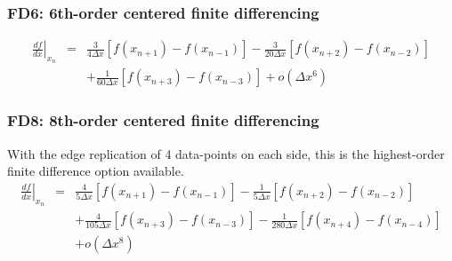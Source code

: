 \documentclass[11pt]{article}
\def\bea{\begin{eqnarray}}
\def\eea{\end{eqnarray}}
\begin{document}
\subsubsection*{FD6: 6th-order centered finite differencing}

\bea \left.\frac{df}{dx}\right|_{x_n} &=&
\frac{3}{4\Delta
x}[f(x_{n+1})-f(x_{n-1})]-\frac{3}{20\Delta x}[f(x_{n+2})-f(x_{n-2})]\nonumber\\
&&+\frac{1}{60\Delta x}[f(x_{n+3})-f(x_{n-3})]+o(\Delta x^6) \eea

\subsubsection*{FD8: 8th-order centered finite differencing}
With the edge replication of 4 data-points on each side, this is the highest-order finite difference option available.
\bea \left.\frac{df}{dx}\right|_{x_n} &=&
\frac{4}{5\Delta
x}[f(x_{n+1})-f(x_{n-1})]-\frac{1}{5\Delta x}[f(x_{n+2})-f(x_{n-2})]\nonumber\\
&&+\frac{4}{105\Delta x}[f(x_{n+3})-f(x_{n-3})]-\frac{1}{280\Delta
x}[f(x_{n+4})-f(x_{n-4})]\nonumber\\
&& +o(\Delta x^8) \eea
\end{document}
